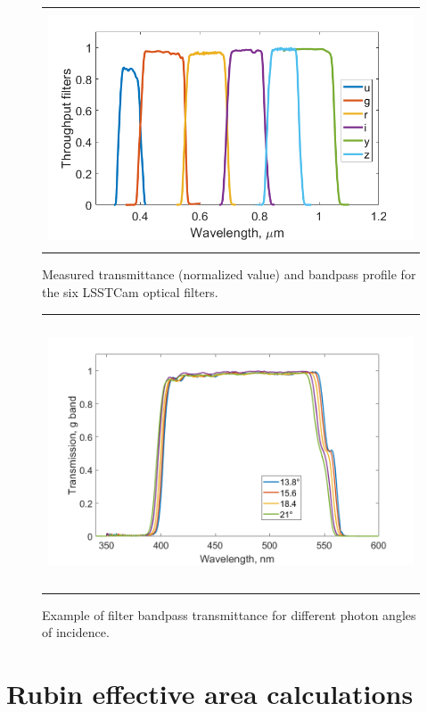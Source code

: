 \documentclass[SE,authoryear,toc]{lsstdoc}
\begin{document}
\begin{figure}
\begin{center}
\begin{tabular}{c}
\includegraphics[height=7cm]{Filters_transmission_rubin}
\end{tabular}
\end{center}
\caption 
{ \label{filters} Measured transmittance (normalized value) and bandpass profile for the six LSSTCam optical filters.}
\end{figure} 


\begin{figure}
\begin{center}
\begin{tabular}{c}
\includegraphics[height=8cm]{g_band_filter_AoI_Rubin}
\end{tabular}
\end{center}
\caption 
{ \label{g_filter} Example of filter bandpass transmittance for different photon angles of incidence.}
\end{figure} 


\clearpage

\section{Rubin effective area calculations} 
\end{document}
